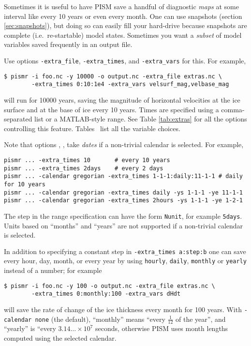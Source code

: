Sometimes it is useful to have PISM save a handful of diagnostic \emph{maps} at some interval like every 10 years or even every month.  One can use snapshots (section \ref{sec:snapshots}), but doing so can easily fill your hard-drive because snapshots are complete (i.e.~re-startable) model states.  Sometimes you want a \emph{subset} of model variables saved frequently in an output file.

Use options \texttt{-extra_file}, \texttt{-extra_times}, and \texttt{-extra_vars} for this.  For example,
\begin{verbatim}
$ pismr -i foo.nc -y 10000 -o output.nc -extra_file extras.nc \
        -extra_times 0:10:1e4 -extra_vars velsurf_mag,velbase_mag
\end{verbatim}
will run for 10000 years, saving the magnitude of horizontal velocities at the ice surface and at the base of ice every 10 years.  Times are specified using a comma-separated list or a MATLAB-style range.  See Table \ref{tab:extras} for all the options controlling this feature.  Tables~\allextras{} list all the variable choices.

Note that options ,
,  take \emph{dates}
if a non-trivial calendar is selected. For example,
\begin{verbatim}
pismr ... -extra_times 10       # every 10 years
pismr ... -extra_times 2days    # every 2 days
pismr ... -calendar gregorian -extra_times 1-1-1:daily:11-1-1 # daily for 10 years
pismr ... -calendar gregorian -extra_times daily -ys 1-1-1 -ye 11-1-1
pismr ... -calendar gregorian -extra_times 2hours -ys 1-1-1 -ye 1-2-1
\end{verbatim}

The step in the range specification can have the form \texttt{Nunit},
for example \texttt{5days}. Units based on ``months'' and ``years''
are not supported if a non-trivial calendar is selected.

In addition to specifying a constant step in \texttt{-extra_times a:step:b} one can save every hour, day, month, or every year by using \texttt{hourly}, \texttt{daily}, \texttt{monthly} or \texttt{yearly} instead of a number; for example
\begin{verbatim}
$ pismr -i foo.nc -y 100 -o output.nc -extra_file extras.nc \
        -extra_times 0:monthly:100 -extra_vars dHdt
\end{verbatim}
will save the rate of change of the ice thickness every month for 100
years. With \texttt{-calendar none} (the default), ``monthly'' means
``every $\frac 1 {12}$ of the year'', and ``yearly'' is ``every
$3.14\dots\times10^7$ seconds, otherwise PISM uses month lengths
computed using the selected calendar.

